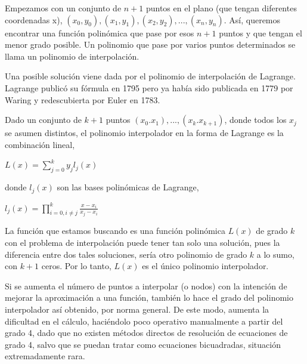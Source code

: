 \hspace{0.4cm} Empezamos con un conjunto de $n+1$ puntos en el plano (que tengan diferentes coordenadas x), $(x_{0}, y_{0}), (x_{1}, y_{1}), (x_{2}, y_{2}),...,(x_{n}, y_{n})$. As\'i, queremos encontrar una funci\'on polin\'omica que pase por esos $n+1$ puntos y que tengan el menor grado posible. Un polinomio que pase por varios puntos determinados se llama un polinomio de interpolaci\'on.

\hspace{0.4cm} Una posible soluci\'on viene dada por el  polinomio de interpolaci\'on de Lagrange. Lagrange public\'o su f\'ormula en 1795 pero ya hab\'ia sido publicada en 1779 por Waring y redescubierta por Euler en 1783.

\hspace{0.4cm} Dado un conjunto de $k + 1$ puntos $(x_{0}.x_{1}),...,(x_{k}.x_{k+1})$, donde todos los $x_{j}$ se asumen distintos, el polinomio interpolador en la forma de Lagrange es la combinaci\'on lineal,

\begin{center}
$\displaystyle{L(x) = \sum_{j=0}^{k} y_{j} l_{j}(x)}$
\end{center}

\vspace{0.2cm}

\noindent donde $ l_{j}(x)$ son las bases polin\'omicas de Lagrange,


\vspace{0.2cm}

\begin{center}
$\displaystyle{l_{j}(x) = \prod_{i=0,i \neq j}^{k} \frac{x-x_{i}}{x_{j}-x_{i}}  }$
\end{center}

\vspace{0.2cm}


\hspace{0.4cm} La funci\'on que estamos buscando es una funci\'on polin\'omica $L(x)$ de grado $k$ con el problema de interpolaci\'on puede tener tan solo una soluci\'on, pues la diferencia entre dos tales soluciones, ser\'ia otro polinomio de grado $k$ a lo sumo, con $k+1$ ceros. Por lo tanto, $L(x)$ es el \'unico polinomio interpolador.


\hspace{0.4cm} Si se aumenta el n\'umero de puntos a interpolar (o nodos) con la intenci\'on de mejorar la aproximaci\'on a una funci\'on, tambi\'en lo hace el grado del polinomio interpolador as\'i obtenido, por norma general. De este modo, aumenta la dificultad en el c\'alculo, haci\'endolo poco operativo manualmente a partir del grado 4, dado que no existen m\'etodos directos de resoluci\'on de ecuaciones de grado 4, salvo que se puedan tratar como ecuaciones bicuadradas, situaci\'on extremadamente rara.

